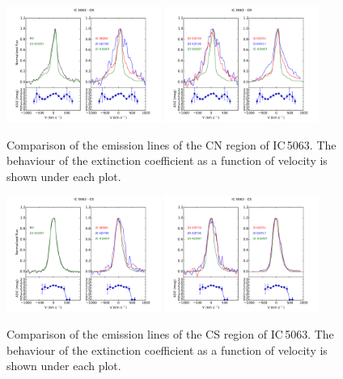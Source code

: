 \documentclass[../main.tex]{subfiles}
\begin{document}
\begin{figure}
\centering
\includegraphics[width=0.45\textwidth]{images/paper1/IC5063_cn_l1.pdf} \quad
\includegraphics[width=0.45\textwidth]{images/paper1/IC5063_cn_l2.pdf}\\
\caption[]{Comparison of the emission lines of the CN region of IC\,5063. The behaviour of the extinction coefficient as a function of velocity is shown under each plot.}
\label{fig:cnl1_I}
\end{figure}

\begin{figure}
\centering
\includegraphics[width=0.45\textwidth]{images/paper1/IC5063_cs_l1.pdf} \quad
\includegraphics[width=0.45\textwidth]{images/paper1/IC5063_cs_l2.pdf}\\
\caption[]{Comparison of the emission lines of the CS region of IC\,5063. The behaviour of the extinction coefficient as a function of velocity is shown under each plot.}
\label{fig:csl1_I}
\end{figure}
\end{document}
